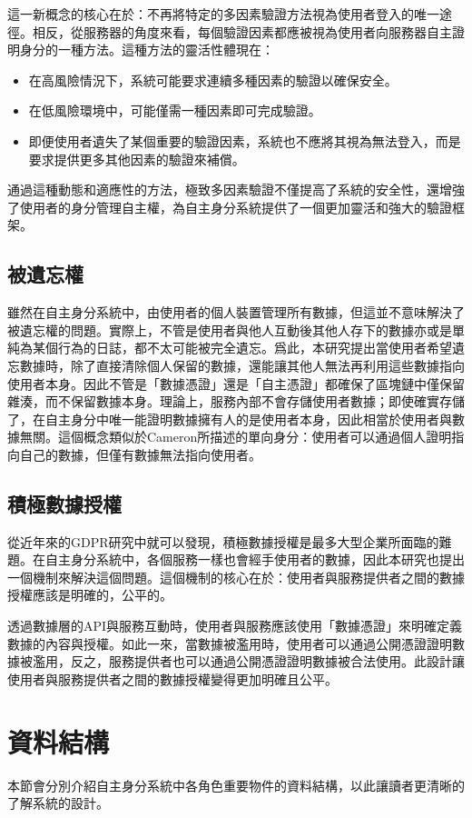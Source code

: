這一新概念的核心在於：不再將特定的多因素驗證方法視為使用者登入的唯一途徑。相反，從服務器的角度來看，每個驗證因素都應被視為使用者向服務器自主證明身分的一種方法。這種方法的靈活性體現在：
\begin{itemize}
  \item 在高風險情況下，系統可能要求連續多種因素的驗證以確保安全。
  \item 在低風險環境中，可能僅需一種因素即可完成驗證。
  \item 即便使用者遺失了某個重要的驗證因素，系統也不應將其視為無法登入，而是要求提供更多其他因素的驗證來補償。
\end{itemize}
通過這種動態和適應性的方法，極致多因素驗證不僅提高了系統的安全性，還增強了使用者的身分管理自主權，為自主身分系統提供了一個更加靈活和強大的驗證框架。
\subsection{被遺忘權}
雖然在自主身分系統中，由使用者的個人裝置管理所有數據，但這並不意味解決了被遺忘權的問題。實際上，不管是使用者與他人互動後其他人存下的數據亦或是單純為某個行為的日誌，都不太可能被完全遺忘。爲此，本研究提出當使用者希望遺忘數據時，除了直接清除個人保留的數據，還能讓其他人無法再利用這些數據指向使用者本身。因此不管是「數據憑證」還是「自主憑證」都確保了區塊鏈中僅保留雜湊，而不保留數據本身。理論上，服務內部不會存儲使用者數據；即使確實存儲了，在自主身分中唯一能證明數據擁有人的是使用者本身，因此相當於使用者與數據無關。這個概念類似於Cameron\cite{cameron2005laws}所描述的單向身分：使用者可以通過個人證明指向自己的數據，但僅有數據無法指向使用者。
\subsection{積極數據授權}
從近年來的GDPR研究中就可以發現，積極數據授權是最多大型企業所面臨的難題。在自主身分系統中，各個服務一樣也會經手使用者的數據，因此本研究也提出一個機制來解決這個問題。這個機制的核心在於：使用者與服務提供者之間的數據授權應該是明確的，公平的。

透過數據層的API與服務互動時，使用者與服務應該使用「數據憑證」來明確定義數據的內容與授權。如此一來，當數據被濫用時，使用者可以通過公開憑證證明數據被濫用，反之，服務提供者也可以通過公開憑證證明數據被合法使用。此設計讓使用者與服務提供者之間的數據授權變得更加明確且公平。
\section{資料結構}
本節會分別介紹自主身分系統中各角色重要物件的資料結構，以此讓讀者更清晰的了解系統的設計。
